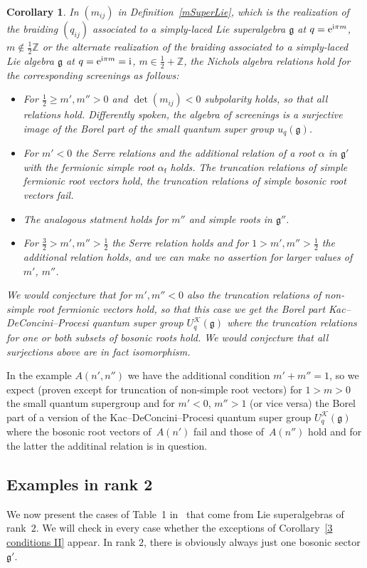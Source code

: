 \documentclass[10pt,a4paper]{amsart}
\numberwithin{equation}{section}
\newtheorem{cor}[teo]{Corollary}
\newcommand{\Z}{\mathbb{Z}}
\newcommand{\g}{\mathfrak{g}}
\newcommand{\f}{\mathsf{f}}
\begin{document}
 \begin{cor}\label{cor_superNA}
 	In $(m_{ij})$ in Definition~{\rm \ref{mSuperLie}}, which is the realization of the braiding $(q_{ij})$ associated to a simply-laced Lie superalgebra $\g$ at $q={\rm e}^{{\rm i}\pi m}$, $m\not\in \frac{1}{2}\Z$ or the alternate realization of the braiding associated to a simply-laced Lie algebra $\g$ at $q={\rm e}^{{\rm i}\pi m}={\rm i}$, $m\in \frac{1}{2}+\Z$, the Nichols algebra relations hold for the corresponding screenings as follows:
 	\begin{itemize}\itemsep=0pt
 		\item For $\frac{1}{2}\geq m', m''>0$ and $\det(m_{ij})<0$ subpolarity holds, so that all relations hold. Differently spoken, the algebra of screenings is a surjective image of the Borel part of the small quantum super group $u_q(\g)$.
 		\item For $m'<0$ the Serre relations and the additional relation of a root $\alpha$ in $\g'$ with the fermionic simple root $\alpha_\f$ holds. The truncation relations of simple fermionic root vectors hold, the truncation relations of simple bosonic root vectors fail.
 		\item The analogous statment holds for $m''$ and simple roots in $\g''$.
 		\item For $\frac{3}{2}>m', m''>\frac{1}{2}$ the Serre relation holds and for $1>m',m''>\frac{1}{2}$ the additional relation holds, and we can make no assertion for larger values of $m'$, $m''$.
 	\end{itemize}
 	We would conjecture that for $m',m''<0$ also the truncation relations of non-simple root fermionic vectors hold, so that this case we get the Borel part Kac--DeConcini--Procesi quantum super group $U_q^\mathcal{K}(\g)$ where the truncation relations for one or both subsets of bosonic roots hold. We would conjecture that all surjections above are in fact isomorphism.
\end{cor}
In the example $A(n',n'')$ we have the additional condition $m'+m''=1$, so we expect (proven except for truncation of non-simple root vectors) for $1>m>0$ the small quantum supergroup and for $m'<0$, $m''>1$ (or vice versa) the Borel part of a version of the Kac--DeConcini--Procesi quantum super group $U_q^\mathcal{K}(\g)$ where the bosonic root vectors of~$A(n')$ fail and those of~$A(n'')$ hold and for the latter the additinal relation is in question.

\subsection{Examples in rank 2}\label{subsec_rank2super}
We now present the cases of Table~1 in~\cite{Hecklist} that come from Lie superalgebras of rank~$2$. We will check in every case whether the exceptions of Corollary~\ref{3 conditions II} appear.
In rank $2$, there is obviously always just one bosonic sector $\mathfrak{g'}$.
\end{document}
